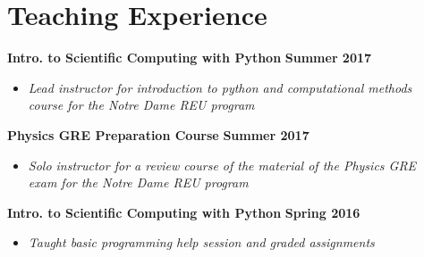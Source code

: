 \documentclass[margin]{res}
\begin{document}
\begin{resume}
\begin{tabular}{l p{4.9in}}
\end{tabular}





\section{Teaching Experience}\label{teaching}
\textbf{Intro. to Scientific Computing with Python} \hfill{} \textbf{Summer 2017}
\begin{itemize}\itemsep -2pt
    \item[] \textit{\small{Lead instructor for introduction to python and computational methods \\course for the Notre Dame REU program}}
    \end{itemize} \vspace{-12pt}
\textbf{Physics GRE Preparation Course} \hfill{} \textbf{Summer 2017}
\begin{itemize}\itemsep -2pt
    \item[] \textit{\small{Solo instructor for a review course of the material of the Physics GRE \\exam for the Notre Dame REU program}}
    \end{itemize} \vspace{-12pt}
\textbf{Intro. to Scientific Computing with Python} \hfill{} \textbf{Spring 2016}
    \begin{itemize}\itemsep -2pt
    \item[] \textit{\small{Taught basic programming help session and graded assignments}}
    \end{itemize} \vspace{-12pt}

\end{resume}
\end{document}
